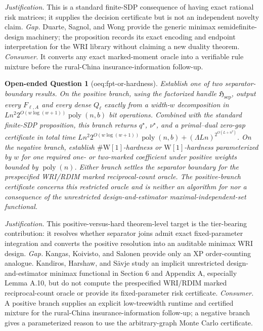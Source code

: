 \documentclass{article}
\newtheorem{openendedquestion}{Open-ended Question}
\begin{document}
\par\smallskip\noindent \textit{Justification.} This is a standard finite-SDP consequence of having exact rational risk matrices; it supplies the decision certificate but is not an independent novelty claim. \textit{Gap.} Duarte, Sagnol, and Wong provide the generic minimax semidefinite-design machinery; the proposition records its exact encoding and endpoint interpretation for the WRI library without claiming a new duality theorem. \textit{Consumer.} It converts any exact marked-moment oracle into a verifiable rule mixture before the rural-China insurance-information follow-up.

\begin{openendedquestion}[oeq:fpt-or-hardness]\label{oeq:fpt-or-hardness}
Establish one of two separator-boundary results. On the positive branch, using the factorized handle \(\mathfrak H_{\mathrm{sep}}\), output every \(F_{\ell,A}\) and every dense \(Q_{\ell}\) exactly from a width-\(w\) decomposition in \(Ln^2 2^{O(w\log(w+1))}\operatorname{poly}(n,b)\) bit operations. Combined with the standard finite-SDP proposition, this branch returns \(q^{\star}\), \(\nu^{\star}\), and a primal--dual zero-gap certificate in total time \(Ln^2 2^{O(w\log(w+1))}\operatorname{poly}(n,b)+(\Lambda Ln)^{2^{O(L+n^2)}}\). On the negative branch, establish \(\#\mathrm{W[1]}\)-hardness or \(\mathrm{W[1]}\)-hardness parameterized by \(w\) for one required one- or two-marked coefficient under positive weights bounded by \(\operatorname{poly}(n)\). Either branch settles the separator boundary for the prespecified WRI/RDIM marked reciprocal-count oracle. The positive-branch certificate concerns this restricted oracle and is neither an algorithm for nor a consequence of the unrestricted design-and-estimator maximal-independent-set functional.
\end{openendedquestion}
\par\smallskip\noindent \textit{Justification.} This positive-versus-hard theorem-level target is the tier-bearing contribution: it resolves whether separator joins admit exact fixed-parameter integration and converts the positive resolution into an auditable minimax WRI design. \textit{Gap.} Kangas, Koivisto, and Salonen provide only an XP order-counting analogue. Kandiros, Harshaw, and Sävje study an implicit unrestricted design-and-estimator minimax functional in Section 6 and Appendix A, especially Lemma A.10, but do not compute the prespecified WRI/RDIM marked reciprocal-count oracle or provide its fixed-parameter risk certificate. \textit{Consumer.} A positive branch supplies an explicit low-treewidth runtime and certified mixture for the rural-China insurance-information follow-up; a negative branch gives a parameterized reason to use the arbitrary-graph Monte Carlo certificate.
\end{document}
